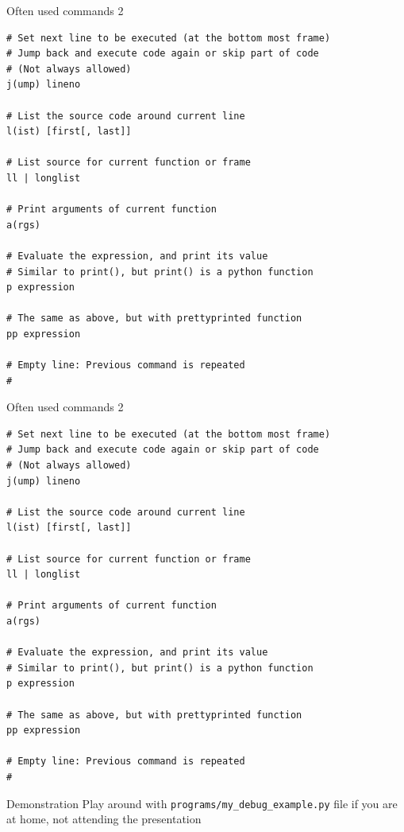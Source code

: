 \documentclass[
    size=20pt,
    style=sailor,
    display=slides,
    paper=smartboard,
    orient=landscape,
]{powerdot}
\begin{document}
\begin{slide}[method=file]{Often used commands 2}
\begin{verbatim}
# Set next line to be executed (at the bottom most frame)
# Jump back and execute code again or skip part of code
# (Not always allowed)
j(ump) lineno

# List the source code around current line
l(ist) [first[, last]]

# List source for current function or frame
ll | longlist

# Print arguments of current function
a(rgs)

# Evaluate the expression, and print its value
# Similar to print(), but print() is a python function
p expression

# The same as above, but with prettyprinted function
pp expression

# Empty line: Previous command is repeated
#
\end{verbatim}
\end{slide}



\begin{slide}[method=file]{Often used commands 2}
\begin{verbatim}
# Set next line to be executed (at the bottom most frame)
# Jump back and execute code again or skip part of code
# (Not always allowed)
j(ump) lineno

# List the source code around current line
l(ist) [first[, last]]

# List source for current function or frame
ll | longlist

# Print arguments of current function
a(rgs)

# Evaluate the expression, and print its value
# Similar to print(), but print() is a python function
p expression

# The same as above, but with prettyprinted function
pp expression

# Empty line: Previous command is repeated
#
\end{verbatim}
\end{slide}


\begin{slide}[method=file]{Demonstration}
Play around with \texttt{programs/my\_debug\_example.py} file if you are at 
home, not attending the presentation
\inputminted[fontsize=\footnotesize, linenos, firstline=1, 
lastline=12]{python}{programs/my_debug_example.py}
\end{slide}
\end{document}
